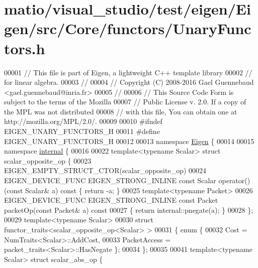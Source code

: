\hypertarget{matio_2visual__studio_2test_2eigen_2_eigen_2src_2_core_2functors_2_unary_functors_8h_source}{}\section{matio/visual\+\_\+studio/test/eigen/\+Eigen/src/\+Core/functors/\+Unary\+Functors.h}
\label{matio_2visual__studio_2test_2eigen_2_eigen_2src_2_core_2functors_2_unary_functors_8h_source}

\begin{DoxyCode}
00001 \textcolor{comment}{// This file is part of Eigen, a lightweight C++ template library}
00002 \textcolor{comment}{// for linear algebra.}
00003 \textcolor{comment}{//}
00004 \textcolor{comment}{// Copyright (C) 2008-2016 Gael Guennebaud <gael.guennebaud@inria.fr>}
00005 \textcolor{comment}{//}
00006 \textcolor{comment}{// This Source Code Form is subject to the terms of the Mozilla}
00007 \textcolor{comment}{// Public License v. 2.0. If a copy of the MPL was not distributed}
00008 \textcolor{comment}{// with this file, You can obtain one at http://mozilla.org/MPL/2.0/.}
00009 
00010 \textcolor{preprocessor}{#ifndef EIGEN\_UNARY\_FUNCTORS\_H}
00011 \textcolor{preprocessor}{#define EIGEN\_UNARY\_FUNCTORS\_H}
00012 
00013 \textcolor{keyword}{namespace }\hyperlink{namespace_eigen}{Eigen} \{
00014 
00015 \textcolor{keyword}{namespace }\hyperlink{namespaceinternal}{internal} \{
00016 
00022 \textcolor{keyword}{template}<\textcolor{keyword}{typename} Scalar> \textcolor{keyword}{struct }scalar\_opposite\_op \{
00023   EIGEN\_EMPTY\_STRUCT\_CTOR(scalar\_opposite\_op)
00024   EIGEN\_DEVICE\_FUNC EIGEN\_STRONG\_INLINE \textcolor{keyword}{const} Scalar operator() (\textcolor{keyword}{const} Scalar& a)\textcolor{keyword}{ const }\{ \textcolor{keywordflow}{return} -a; \}
00025   \textcolor{keyword}{template}<\textcolor{keyword}{typename} Packet>
00026   EIGEN\_DEVICE\_FUNC EIGEN\_STRONG\_INLINE \textcolor{keyword}{const} Packet packetOp(\textcolor{keyword}{const} Packet& a)\textcolor{keyword}{ const}
00027 \textcolor{keyword}{  }\{ \textcolor{keywordflow}{return} internal::pnegate(a); \}
00028 \};
00029 \textcolor{keyword}{template}<\textcolor{keyword}{typename} Scalar>
00030 \textcolor{keyword}{struct }functor\_traits<scalar\_opposite\_op<Scalar> >
00031 \{ \textcolor{keyword}{enum} \{
00032     Cost = NumTraits<Scalar>::AddCost,
00033     PacketAccess = packet\_traits<Scalar>::HasNegate \};
00034 \};
00035 
00041 \textcolor{keyword}{template}<\textcolor{keyword}{typename} Scalar> \textcolor{keyword}{struct }scalar\_abs\_op \{

\end{DoxyCode}
